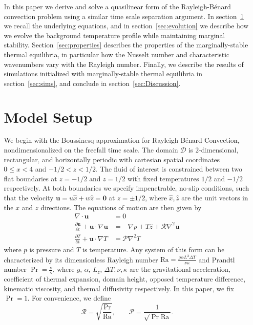 \documentclass[reprint,amsmath,amssymb,aps,nofootinbib]{revtex4-1}
\newcommand\Ra{\mathrm{Ra}}
\renewcommand{\vec}[1]{\boldsymbol{#1}}
\begin{document}
In this paper we derive and solve a quasilinear form of the Rayleigh-B\'{e}nard convection problem using a similar time scale separation argument.
In section~\ref{sec:model} we recall the underlying equations, and in section~\ref{sec:evolution} we describe how we evolve the background temperature profile while maintaining marginal stability.
Section~\ref{sec:properties} describes the properties of the marginally-stable thermal equilibria, in particular how the Nusselt number and characteristic wavenumbers vary with the Rayleigh number.
Finally, we describe the results of simulations initialized with marginally-stable thermal equilibria in section~\ref{sec:sims}, and conclude in section~\ref{sec:Discussion}.
 
\section{Model Setup}\label{sec:model}
We begin with the Boussinesq approximation for Rayleigh-Bénard Convection, nondimensionalized on the freefall time scale. 
The domain $\mathcal{D}$ is 2-dimensional, rectangular, and horizontally periodic with cartesian spatial coordinates $0 \leq x < 4$ and $-1/2 < z < 1/2$. 
The fluid of interest is constrained between two flat boundaries at $z = -1/2$ and $z = 1/2$ with fixed temperatures $1/2$ and $-1/2$ respectively. 
At both boundaries we specify impenetrable, no-slip conditions, such that the velocity $\vec{u} = u \hat{x} + w \hat{z} = \vec{0}$ at $z = \pm 1/2$, where $\hat{x}, \hat{z}$ are the unit vectors in the $x$ and $z$ directions. 
The equations of motion are then given by
\begin{align}
    \nabla \cdot \vec{u} &= 0 \label{EQ:motion1}\\
    \frac{\partial \vec{u}}{\partial t} + \vec{u} \cdot \nabla \vec{u} &= - \nabla p + T \hat{z} + \mathcal{R} \nabla^2 \vec{u} \label{EQ:motion2}\\
    \frac{\partial T}{\partial t} + \vec{u} \cdot \nabla T &= \mathcal{P} \nabla^2 T \label{EQ:motion3}
\end{align}
where $p$ is pressure and $T$ is temperature. 
Any system of this form can be characterized by its dimensionless Rayleigh number $\Ra = \frac{g\alpha L^3 \Delta T}{\nu \kappa}$ and Prandtl number $\Pr = \frac{\nu}{\kappa}$, where $g, \, \alpha, \, L_z, \, \Delta T, \nu, \kappa$ are the gravitational acceleration, coefficient of thermal expansion, domain height, opposed temperature difference, kinematic viscosity, and thermal diffusivity respectively. 
In this paper, we fix $\Pr = 1$.
For convenience, we define
\begin{equation}
\mathcal{R} = \sqrt{\frac{\Pr}{\Ra}}, \qquad \mathcal{P} = \frac{1}{\sqrt{\Pr \Ra}}.
\end{equation}
\end{document}
